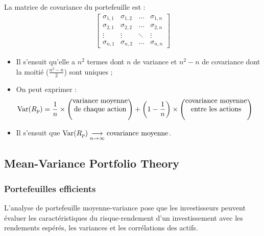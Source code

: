 \documentclass[10pt, french]{article}
\begin{document}
\begin{multicols*}{2}
La matrice de covariance du portefeuille est : 
\begin{align*}
	\begin{bmatrix}
	\sigma_{1, 1}	&	\sigma_{1, 2}	&	\hdots	&	\sigma_{1, n}	\\
	\sigma_{2, 1}	&	\sigma_{2, 2}	&	\hdots	&	\sigma_{2, n}	\\
	\vdots	&	\vdots	&	\ddots	&	\vdots	\\
	\sigma_{n, 1}	&	\sigma_{n, 2}	&	\hdots	&	\sigma_{n, n}	
	\end{bmatrix}
\end{align*}
\begin{itemize}
	\item	Il s'ensuit qu'elle a $n^{2}$ termes dont $n$ de variance et $n^{2}	-	n$ de covariance dont la moitié ($\frac{n^{2} - n}{2}$) sont uniques ;
	\item	On peut exprimer :
	\setlength{\mathindent}{-1cm}
		\begin{align*}
		\text{Var}(R_{p})	
		&=	\frac{1}{n} \times \left(\shortstack{variance moyenne\\ de chaque action}\right) + \left(1 - \frac{1}{n}\right)  \times  \left(\shortstack{covariance moyenne\\	entre les actions}\right)
		\end{align*}
	\setlength{\mathindent}{1cm}
	\item	Il s'ensuit que $\text{Var}(R_{p}) \underset{n\rightarrow \infty}{\longrightarrow} \shortstack{covariance moyenne}$.
\end{itemize}


\columnbreak
\subsection{Mean-Variance Portfolio Theory}
\subsubsection{Portefeuilles efficients}
\begin{definitionNOHFILL}
L'analyse de portefeuille moyenne-variance pose que les investisseurs peuvent évaluer les caractéristiques du risque-rendement d'un investissement avec les rendements espérés, les variances et les corrélations des actifs.
\end{definitionNOHFILL}


\end{multicols*}
\end{document}

